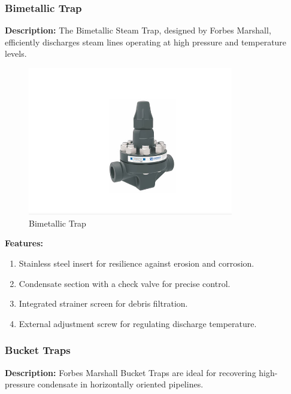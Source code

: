 \subsubsection{Bimetallic Trap}

\textbf{Description:} The Bimetallic Steam Trap, designed by Forbes Marshall, efficiently discharges steam lines operating at high pressure and temperature levels.
\begin{figure}[h]
    \centering
    \includegraphics[width=0.8\textwidth,height=0.33\textheight,keepaspectratio]{figs/lastmin/bimetallic_thermostatic_steam_trap.png}
    \caption{Bimetallic Trap}
    \label{fig:bimetallic_trap}
\end{figure}


\textbf{Features:}
\begin{enumerate}
    \item Stainless steel insert for resilience against erosion and corrosion.
    \item Condensate section with a check valve for precise control.
    \item Integrated strainer screen for debris filtration.
    \item External adjustment screw for regulating discharge temperature.
\end{enumerate}
\subsubsection{Bucket Traps}

\textbf{Description:} Forbes Marshall Bucket Traps are ideal for recovering high-pressure condensate in horizontally oriented pipelines.

